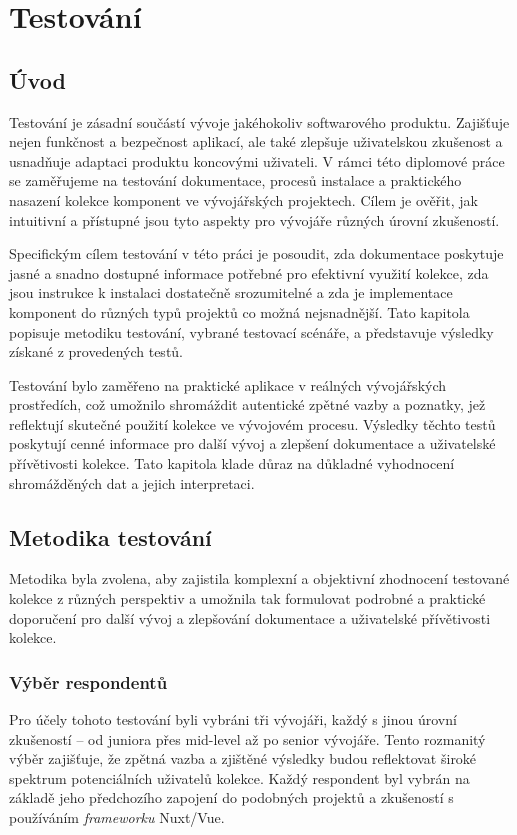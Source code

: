 
\chapter{Testování}

\section{Úvod}
Testování je zásadní součástí vývoje jakéhokoliv softwarového produktu. Zajišťuje nejen funkčnost a bezpečnost aplikací, ale také zlepšuje uživatelskou zkušenost a usnadňuje adaptaci produktu koncovými uživateli. V rámci této diplomové práce se zaměřujeme na testování dokumentace, procesů instalace a praktického nasazení kolekce komponent ve vývojářských projektech. Cílem je ověřit, jak intuitivní a přístupné jsou tyto aspekty pro vývojáře různých úrovní zkušeností.

Specifickým cílem testování v této práci je posoudit, zda dokumentace poskytuje jasné a snadno dostupné informace potřebné pro efektivní využití kolekce, zda jsou instrukce k instalaci dostatečně srozumitelné a zda je implementace komponent do různých typů projektů co možná nejsnadnější. Tato kapitola popisuje metodiku testování, vybrané testovací scénáře, a představuje výsledky získané z provedených testů.

Testování bylo zaměřeno na praktické aplikace v reálných vývojářských prostředích, což umožnilo shromáždit autentické zpětné vazby a poznatky, jež reflektují skutečné použití kolekce ve vývojovém procesu. Výsledky těchto testů poskytují cenné informace pro další vývoj a zlepšení dokumentace a uživatelské přívětivosti kolekce. Tato kapitola klade důraz na důkladné vyhodnocení shromážděných dat a jejich interpretaci.

\section{Metodika testování}
Metodika byla zvolena, aby zajistila komplexní a objektivní zhodnocení testované kolekce z různých perspektiv a umožnila tak formulovat podrobné a praktické doporučení pro další vývoj a zlepšování dokumentace a uživatelské přívětivosti kolekce.

\subsection{Výběr respondentů}
Pro účely tohoto testování byli vybráni tři vývojáři, každý s jinou úrovní zkušeností – od juniora přes mid-level až po senior vývojáře. Tento rozmanitý výběr zajišťuje, že zpětná vazba a zjištěné výsledky budou reflektovat široké spektrum potenciálních uživatelů kolekce. Každý respondent byl vybrán na základě jeho předchozího zapojení do podobných projektů a zkušeností s používáním \emph{frameworku} Nuxt/Vue.

